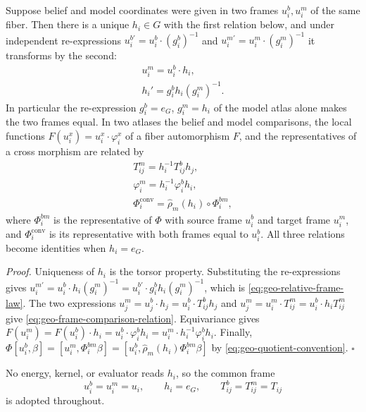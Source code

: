 Suppose belief and model coordinates were given in two frames $u_i^b,u_i^m$ of the same fiber. Then
there is a unique $h_i\in G$ with the first relation below, and under independent re-expressions
$u_i^{b\prime}=u_i^b\cdot(g_i^b)^{-1}$ and $u_i^{m\prime}=u_i^m\cdot(g_i^m)^{-1}$ it transforms by the
second:
\begin{gather}
u_i^m=u_i^b\cdot h_i,
\label{eq:geo-relative-frame}\\
h_i'=g_i^bh_i(g_i^m)^{-1}.
\label{eq:geo-relative-frame-law}
\end{gather}
In particular the re-expression $g_i^b=e_G$, $g_i^m=h_i$ of the model atlas alone makes the two
frames equal. In two atlases the belief and model comparisons, the local functions
$F(u_i^x)=u_i^x\cdot\varphi_i^x$ of a fiber automorphism $F$, and the representatives of a cross
morphism are related by
\begin{gather}
T_{ij}^m=h_i^{-1}T_{ij}^bh_j,
\label{eq:geo-frame-comparison-relation}\\
\varphi_i^m=h_i^{-1}\varphi_i^bh_i,
\label{eq:geo-diagonal-gauge-functions}\\
\Phi_i^{\mathrm{conv}}=\widehat\rho_m(h_i)\circ\Phi_i^{bm},
\label{eq:geo-map-bundle-frame-conversion}
\end{gather}
where $\Phi_i^{bm}$ is the representative of $\Phi$ with source frame $u_i^b$ and target frame
$u_i^m$, and $\Phi_i^{\mathrm{conv}}$ is its representative with both frames equal to $u_i^b$. All
three relations become identities when $h_i=e_G$. 

\noindent\emph{Proof.}
Uniqueness of $h_i$ is the torsor property. Substituting the re-expressions gives
$u_i^{m\prime}=u_i^b\cdot h_i(g_i^m)^{-1}=u_i^{b\prime}\cdot g_i^bh_i(g_i^m)^{-1}$, which is
\eqref{eq:geo-relative-frame-law}. The two expressions $u_j^m=u_j^b\cdot h_j=u_i^b\cdot T_{ij}^bh_j$
and $u_j^m=u_i^m\cdot T_{ij}^m=u_i^b\cdot h_iT_{ij}^m$ give
\eqref{eq:geo-frame-comparison-relation}. Equivariance gives
$F(u_i^m)=F(u_i^b)\cdot h_i=u_i^b\cdot\varphi_i^bh_i=u_i^m\cdot h_i^{-1}\varphi_i^bh_i$. Finally,
$\Phi[u_i^b,\beta]=[u_i^m,\Phi_i^{bm}\beta]=[u_i^b,\widehat\rho_m(h_i)\Phi_i^{bm}\beta]$ by
\eqref{eq:geo-quotient-convention}. \hfill$\square$

No energy, kernel, or evaluator reads $h_i$, so the common frame
\begin{equation}
u_i^b=u_i^m=u_i,
\qquad
h_i=e_G,
\qquad
T_{ij}^b=T_{ij}^m=T_{ij}
\label{eq:geo-diagonal-principal}
\end{equation}
is adopted throughout.

